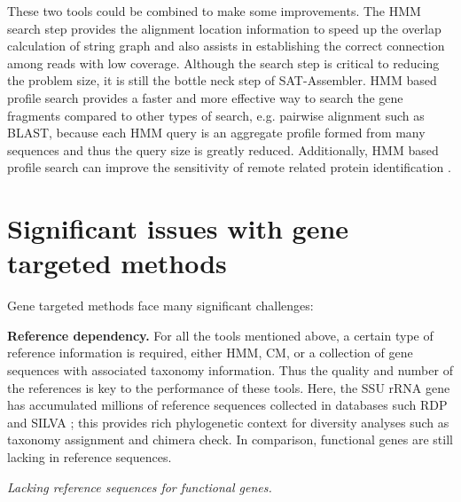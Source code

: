 \documentclass[]{msu-thesis}
\begin{document}
These two tools could be combined to make some improvements.
The HMM search step
provides the alignment location information to speed up the
overlap calculation of string graph and also assists in establishing the
correct connection among reads with low coverage.
Although the search step is critical to reducing
the problem size, it is still the bottle neck step of
SAT-Assembler. HMM based profile search provides a faster and more
effective way to search the gene fragments compared to other types
of search, e.g. pairwise alignment such as BLAST, because each HMM query
is an aggregate profile formed from many sequences and thus the query size
is greatly reduced. Additionally, HMM based profile search can improve
the sensitivity of remote related protein identification
\cite{eddy_new_2009}.

\section{Significant issues with gene targeted methods}

Gene targeted methods face many significant challenges:

\textbf{Reference dependency.} For all the tools mentioned above, a certain
type of reference information is required, either HMM, CM, or a
collection of gene sequences with associated taxonomy
information. Thus the quality and number of the references is key to
the performance of these tools. Here, the SSU rRNA gene has
accumulated millions of reference sequences collected in 
databases such RDP and SILVA
\cite{cole_ribosomal_2014,quast_silva_2013}; this provides rich
phylogenetic context for diversity analyses such as taxonomy
assignment and chimera check.  In comparison, functional
genes are still lacking in reference sequences.

\textit{Lacking reference sequences for functional genes. }
\end{document}
